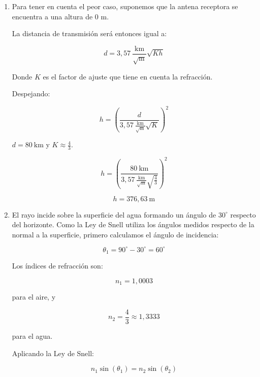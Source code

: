 \documentclass[11pt,a4paper]{article}
\begin{document}
\begin{enumerate}[label=4.\arabic*), itemsep=0.3cm]
  \item

        Para tener en cuenta el peor caso, suponemos que la antena receptora se encuentra a una altura de 0 m.

        La distancia de transmisión será entonces igual a:

        \[
          d = 3,57\ \frac{\text{km}}{\sqrt{\text{m}}} \sqrt{Kh}
        \]

        Donde $K$ es el factor de ajuste que tiene en cuenta la refracción.

        Despejando:

        \[
          h = \left(\frac{d}{3,57\ \frac{\text{km}}{\sqrt{\text{m}}} \sqrt{K}}\right)^2
        \]

        $d = 80\ \text{km}$ y $K \approx \frac{4}{3}$.

        \[
          h = \left(\frac{80\ \text{km}}{3,57\ \frac{\text{km}}{\sqrt{\text{m}}} \sqrt{\frac{4}{3}}}\right)^2
        \]

        \[
          h = 376,63\ \text{m}
        \]

  \item
        El rayo incide sobre la superficie del agua formando un ángulo de $30^\circ$ respecto del horizonte. Como la Ley de Snell utiliza los ángulos medidos respecto de la normal a la superficie, primero calculamos el ángulo de incidencia:

        \begin{equation}
          \theta_1 = 90^\circ - 30^\circ = 60^\circ
        \end{equation}

        Los índices de refracción son:

        \begin{equation}
          n_1 = 1{,}0003
        \end{equation}

        para el aire, y

        \begin{equation}
          n_2 = \frac{4}{3} \approx 1{,}3333
        \end{equation}

        para el agua.

        Aplicando la Ley de Snell:

        \begin{equation}
          n_1 \sin(\theta_1) = n_2 \sin(\theta_2)
        \end{equation}


\end{enumerate}
\end{document}
